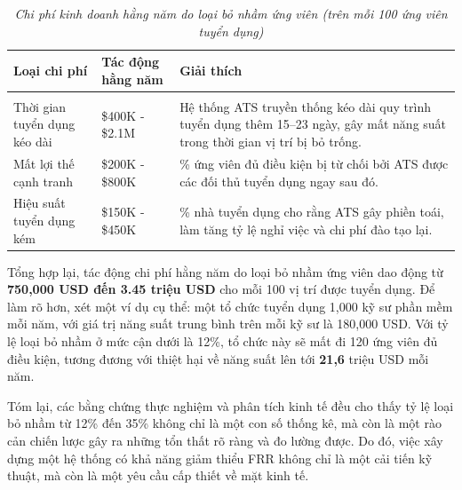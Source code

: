 \documentclass{article}
\begin{document}
\begin{longtable}{|
  >{\raggedright\arraybackslash}p{}|
  >{\raggedright\arraybackslash}p{}|
  >{\raggedright\arraybackslash}p{}|}
  \hline
  \textbf{Loại chi phí} &
  \textbf{Tác động hằng năm} &
  \textbf{Giải thích} \\
  \hline
  \endfirsthead

  \endhead

  \hline
  \endfoot

  \hline
  \caption{\centering\textit{Chi phí kinh doanh hằng năm do loại bỏ nhầm ứng viên (trên mỗi 100 ứng viên tuyển dụng)}}
  \label{tab:ats-false-rejection-cost} \\
  \endlastfoot

  Thời gian tuyển dụng kéo dài &
  \$400K - \$2.1M &
  Hệ thống ATS truyền thống kéo dài quy trình tuyển dụng thêm 15–23 ngày, gây mất năng suất trong thời gian vị trí bị bỏ trống. \\
  \hline

  Mất lợi thế cạnh tranh &
  \$200K - \$800K &
  73\% ứng viên đủ điều kiện bị từ chối bởi ATS được các đối thủ tuyển dụng ngay sau đó. \\
  \hline

  Hiệu suất tuyển dụng kém &
  \$150K - \$450K &
  58\% nhà tuyển dụng cho rằng ATS gây phiền toái, làm tăng tỷ lệ nghỉ việc và chi phí đào tạo lại. \\

\end{longtable}
Tổng hợp lại, tác động chi phí hằng năm do loại bỏ nhầm ứng viên dao động từ \textbf{750,000 USD đến 3.45 triệu USD} cho mỗi 100 vị trí được tuyển dụng. Để làm rõ hơn, xét một ví dụ cụ thể: một tổ chức tuyển dụng 1,000 kỹ sư phần mềm mỗi năm, với giá trị năng suất trung bình trên mỗi kỹ sư là 180,000 USD. Với tỷ lệ loại bỏ nhầm ở mức cận dưới là 12\%, tổ chức này sẽ mất đi 120 ứng viên đủ điều kiện, tương đương với thiệt hại về năng suất lên tới \textbf{21,6} triệu USD mỗi năm.

Tóm lại, các bằng chứng thực nghiệm và phân tích kinh tế đều cho thấy tỷ lệ loại bỏ nhầm từ 12\% đến 35\% không chỉ là một con số thống kê, mà còn là một rào cản chiến lược gây ra những tổn thất rõ ràng và đo lường được. Do đó, việc xây dựng một hệ thống có khả năng giảm thiểu FRR không chỉ là một cải tiến kỹ thuật, mà còn là một yêu cầu cấp thiết về mặt kinh tế.
\end{document}

